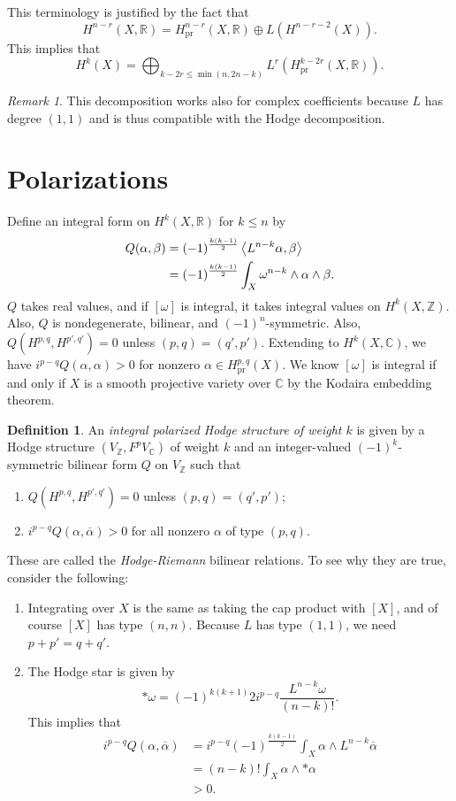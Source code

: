 \documentclass[leqno, openany]{memoir}
\theoremstyle{definition}
\newtheorem{defn}[thm]{Definition}
\theoremstyle{remark}
\newtheorem{rmk}[thm]{Remark}
\theoremstyle{plain}
\theoremstyle{definition}
\theoremstyle{remark}
\newcommand{\R}{\mathbb{R}}
\newcommand{\C}{\mathbb{C}}
\newcommand{\Z}{\mathbb{Z}}
\newcommand{\mr}[1]{\mathrm{#1}}
\newcommand{\ol}[1]{\overline{#1}}
\begin{document}
This terminology is justified by the fact that
\[ H^{n-r}(X, \R) = H^{n-r}_{\mr{pr}}(X, \R) \oplus L(H^{n-r-2}(X)). \]
This implies that
\[ H^k(X) = \bigoplus_{k-2r \leq \min(n, 2n-k)} L^r(H^{k-2r}_{\mr{pr}}(X, \R)). \]
\begin{rmk}
    This decomposition works also for complex coefficients because $L$ has degree $(1,1)$ and is thus compatible with the Hodge decomposition.
\end{rmk}

\section{Polarizations}%
\label{sec:polarizations}

Define an integral form on $H^k(X, \R)$ for $k \leq n$ by
\begin{align*}
    Q(\alpha, \beta) &= (-1)^{\frac{k(k-1)}{2}} \ev{L^{n-k} \alpha, \beta} \\
    &= (-1)^{\frac{k(k-1)}{2}} \int_X \omega^{n-k} \wedge \alpha \wedge \beta.
\end{align*}
$Q$ takes real values, and if $[\omega]$ is integral, it takes integral values on $H^k(X, \Z)$. Also, $Q$ is nondegenerate, bilinear, and $(-1)^n$-symmetric. Also, $Q(H^{p,q}, H^{p',q'}) = 0$ unless $(p,q) = (q',p')$. Extending to $H^k(X, \C)$, we have $i^{p-q}Q(\alpha, \alpha) > 0$ for nonzero $\alpha \in H^{p,q}_{\mr{pr}}(X)$. We know $[\omega]$ is integral if and only if $X$ is a smooth projective variety over $\C$ by the Kodaira embedding theorem.

\begin{defn}
    An \textit{integral polarized Hodge structure of weight $k$} is given by a Hodge structure $(V_{\Z}, F^p V_{\C})$ of weight $k$ and an integer-valued $(-1)^k$-symmetric bilinear form $Q$ on $V_{\Z}$ such that
    \begin{enumerate}
        \item $Q(H^{p,q}, H^{p',q'}) = 0$ unless $(p,q) = (q',p')$;
        \item $i^{p-q} Q(\alpha, \ol{\alpha}) > 0$ for all nonzero $\alpha$ of type $(p,q)$.
    \end{enumerate}
\end{defn}
These are called the \textit{Hodge-Riemann} bilinear relations. To see why they are true, consider the following:
\begin{enumerate}
    \item Integrating over $X$ is the same as taking the cap product with $[X]$, and of course $[X]$ has type $(n,n)$. Because $L$ has type $(1,1)$, we need $p + p' = q+q'$.
    \item The Hodge star is given by
        \[ * \omega = (-1)^{k(k+1)}{2} i^{p-q} \frac{L^{n-k} \omega}{(n-k)!}. \]
        This implies that
        \begin{align*}
            i^{p-q} Q(\alpha, \ol{\alpha}) &= i^{p-q} (-1)^{\frac{k(k-1)}{2}} \int_X \alpha \wedge L^{n-k} \ol{\alpha} \\
            &= (n-k)! \int_X \alpha \wedge * \alpha \\
            &> 0.
        \end{align*}
\end{enumerate}
\end{document}
